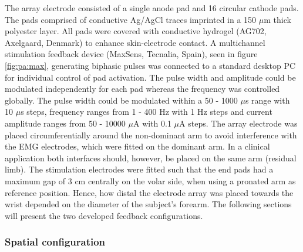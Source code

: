 The array electrode consisted of a single anode pad and 16 circular cathode pads. The pads comprised of conductive Ag/AgCl traces imprinted in a 150 $\mu$m thick polyester layer. All pads were covered with conductive hydrogel (AG702, Axelgaard, Denmark) to enhance skin-electrode contact.  A multichannel stimulation feedback device (MaxSens, Tecnalia, Spain), seen in figure \ref{fig:pa:max}, generating biphasic pulses was connected to a standard desktop PC for individual control of pad activation. The pulse width and amplitude could be modulated independently for each pad whereas the frequency was controlled globally. The pulse width could be modulated within a 50 - 1000 $\mu $s range with 10 $\mu $s steps, frequency ranges from 1 - 400 Hz with 1 Hz steps and current amplitude ranges from 50 - 10000 $\mu $A with 0.1 $\mu $A steps. The array electrode was placed circumferentially around the non-dominant arm to avoid interference with the EMG electrodes, which were fitted on the dominant arm. In a clinical application both interfaces should, however, be placed on the same arm (residual limb). The stimulation electrodes were fitted such that the end pads had a maximum gap of 3 cm centrally on the volar side, when using a pronated arm as reference position. Hence, how distal the electrode array was placed towards the wrist depended on the diameter of the subject's forearm. The following sections will present the two developed feedback configurations. 


\subsubsection{Spatial configuration}

